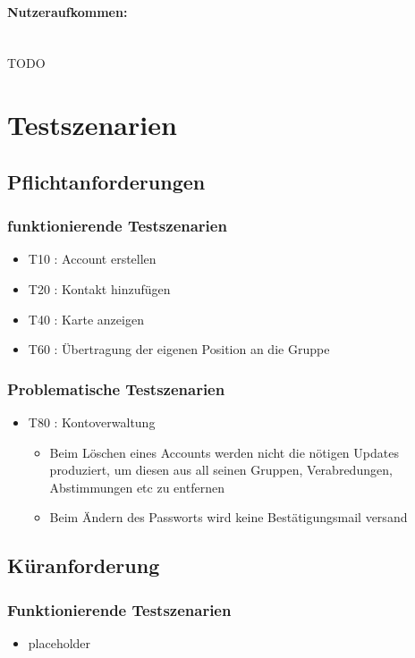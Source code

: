 \documentclass[parskip=full,11pt]{scrartcl}
\begin{document}
\paragraph{\small Nutzeraufkommen:} \hspace{0pt} \\
TODO %

\section{Testszenarien}

\subsection{Pflichtanforderungen}
	\subsubsection{funktionierende Testszenarien}
	\begin{itemize}
		\item T10 : Account erstellen
		\item T20 : Kontakt hinzufügen
		\item T40 : Karte anzeigen
		\item T60 : Übertragung der eigenen Position an die Gruppe
	\end{itemize}

	\subsubsection{Problematische Testszenarien}
	\begin{itemize}
		\item T80 : Kontoverwaltung
			\begin{itemize}
            \item Beim Löschen eines Accounts werden nicht die nötigen Updates
                produziert, um diesen aus all seinen Gruppen, Verabredungen,
                Abstimmungen etc zu entfernen
            \item Beim Ändern des Passworts wird keine Bestätigungsmail versand
			\end{itemize}
	\end{itemize}

\subsection{Küranforderung}
	\subsubsection{Funktionierende Testszenarien}
	\begin{itemize}
	\item placeholder
	\end{itemize}
\end{document}
